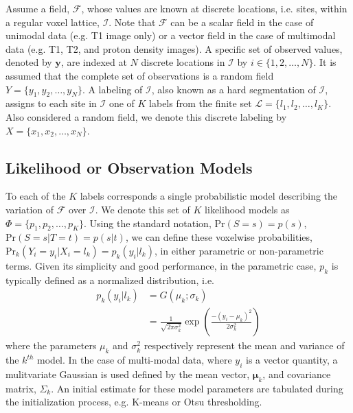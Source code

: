 \documentclass[11pt,english]{article}
\begin{document}
Assume a field, $\mathcal{F}$, whose values are known at discrete locations, i.e. sites, within a regular voxel lattice, $\mathcal{I}$.  Note that $\mathcal{F}$ can be a scalar field in the case of unimodal data (e.g. T1 image only) or a vector field in the case of multimodal data (e.g. T1, T2, and proton density images).
A specific set of observed values, denoted by $\mathbf{y}$, are indexed at $N$ discrete locations in $\mathcal{I}$ by $i \in \{1, 2, \ldots, N\}$.  It is assumed that the complete set of observations is a random field $Y = \{y_1, y_2, \ldots, y_N \}$.    A labeling of $\mathcal{I}$, 
also known as a hard segmentation of $\mathcal{I}$,
assigns to each site in $\mathcal{I}$ one of $K$ labels from the finite set $\mathcal{L} = \{l_1, l_2, \ldots, l_K\}$.  Also considered a random field, we denote this discrete labeling by $X = \{x_1, x_2, \ldots, x_N\}$.


\subsection{Likelihood or Observation Models}

To each of the $K$ labels corresponds a single probabilistic model describing the variation of $\mathcal{F}$ over $\mathcal{I}$.  We denote this set of $K$ likelihood models as $\Phi = \{p_1, p_2, \ldots, p_K\}$.  Using the standard notation, $\mathrm{Pr}(S=s) = p(s)$, $\mathrm{Pr}(S=s|T=t) = p(s|t)$, we can define these voxelwise probabilities, $\mathrm{Pr}_k( Y_i = y_i | X_i = l_k ) = p_k(y_i|l_k)$, in either parametric or non-parametric terms.   Given its simplicity and good performance, in the parametric case, $p_k$ is typically defined as a normalized distribution, i.e.
\begin{align}\label{eq:param}
  p_k\left(y_i|l_k\right) &= G\left(\mu_k;\sigma_k\right) \nonumber \\
                    &= \frac{1}{\sqrt{2\pi \sigma_k^2}}\exp\left( \frac{ -(y_i - \mu_k)^2 }{2\sigma_k^2} \right)
\end{align}
where the parameters $\mu_k$ and $\sigma_k^2$ respectively represent the mean and variance of the $k^{th}$ model.  In the case of multi-modal data, where $y_i$ is a vector quantity, a mulitvariate Gaussian is used defined by the mean vector, $\boldsymbol{\mu}_k$, and covariance matrix, $\Sigma_k$.  An initial estimate for these model parameters are tabulated during the initialization process, e.g. K-means or Otsu thresholding.
\end{document}
